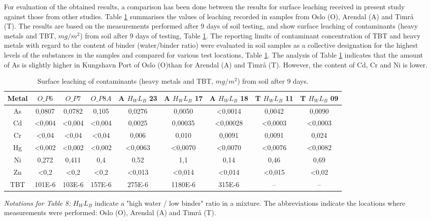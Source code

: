 \documentclass[algorithms,article,submit,pdftex,moreauthors]{Definitions/mdpi}
\begin{document}
For evaluation of the obtained results, a comparison has been done between the results for surface leaching received in present study against those from other studies. Table \ref{tab07} summarises the values of leaching recorded in samples from Oslo (O), Arendal (A) and Timrå (T). The results are based on the measurements performed after 9 days of soil testing, and show surface leaching of contaminants (heavy metals and TBT, $mg/m^2$) from soil after 9 days of testing, Table \ref{tab07}. The reporting limits of contaminant concentration of TBT and heavy metals with regard to the content of binder (water/binder ratio) were evaluated in soil samples as a collective designation for the highest levels of the substances in the samples and compared for various test locations, Table \ref{tab07}. The analysis of Table \ref{tab07} indicates that the amount of As is slightly higher in Kungshavn Port of Oslo (O)than for Arendal (A) and Timrå (T). However, the content of Cd, Cr and Ni is lower. 

\begin{table}[H] 
\begin{threeparttable}
\centering
\caption{Surface leaching of contaminants (heavy metals and TBT, $mg/m^2$) from soil after 9 days.\label{tab07}}
\small
\setlength\tabcolsep{0pt}
\begin{tabularx}{\textwidth}{@{\extracolsep{\fill}} ccccccccc }
\toprule
\textbf{Metal} & \textbf{$O\_P6$} & \textbf{$O\_P7$} & \textbf{$O\_P8A$} & \textbf{A $H_WL_B$ 23} & \textbf{A $H_WL_B$ 17} & \textbf{A $H_WL_B$ 18} & \textbf{T $H_WL_B$ 11} & \textbf{T $H_WL_B$ 09}\\
\midrule
As &  0,0807 & 0,0782 & 0,105 & 0,0276 & 0,0050 & <0,0014 & 0,0042 & 0,0090 \\
Cd & <0,004 & <0,004 & <0,004 & 0,0025 & 0,00035 & <0,00028 & <0,0003 & <0,0003 \\
Cr & <0,04 & <0,04 & <0,04 & 0,006 & 0,010 & 0,0091 & 0,0091 & 0,024 \\
Hg & <0,002 & <0,002 & <0,002 & <0,0063 & <0,0070 & <0,0070 & <0,0076 & <0,0082 \\
Ni & 0,272 & 0,411 & 0,4 & 0,52 & 1,1 & 0,14 & 0,46 & 0,69 \\
Zn & <0,2 & <0,2 & <0,2 & <0,013 & <0,014 & <0,014 & <0,015 & <0,02 \\
TBT & 101E-6 & 103E-6 & 157E-6 & 275E-6 & 1180E-6 & 315E-6 & -- & -- \\
\bottomrule
\end{tabularx}
\begin{tablenotes}
      \small
      	\item \emph{Notations for Table 8:}  $H_WL_B$ indicate a "high water / low binder" ratio in a mixture. The abbreviations indicate the locations where measurements were performed: Oslo (O), Arendal (A) and Timrå (T). 
    \end{tablenotes}
  \end{threeparttable}
\end{table}
\end{document}

